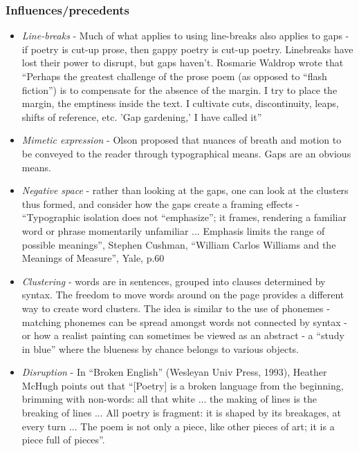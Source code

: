 \documentclass[11pt]{article}
\begin{document}
\subsubsection*{Influences/precedents}
\begin{itemize}
\item \textit{Line-breaks} - Much of what applies to using line-breaks also applies to gaps - if poetry is cut-up prose, then gappy poetry is cut-up poetry.  Linebreaks have lost their power to disrupt, but gaps haven't. Rosmarie Waldrop wrote that ``Perhaps the greatest challenge of the prose poem (as opposed to ``flash fiction'') is to compensate for the absence of the margin. I try to place the margin, the emptiness inside the text. I cultivate cuts, discontinuity, leaps, shifts of reference, etc. 'Gap gardening,' I have called it''

\item \textit{Mimetic expression} -
Olson proposed that nuances of breath and motion to be conveyed to the reader through typographical means. Gaps are an obvious means.

\item \textit{Negative space} - rather than looking at the gaps, one can look at the clusters thus formed, and consider how the gaps create a framing effects -  ``Typographic isolation does not ``emphasize''; it frames, rendering a familiar word or phrase momentarily unfamiliar ... Emphasis limits the range of possible meanings'', Stephen Cushman, ``William Carlos Williams and the Meanings of Measure'', Yale, p.60

\item \textit{Clustering} - words are in sentences, grouped into clauses determined by syntax. The freedom to move words around on the page provides a different way to create word clusters. The idea is similar to the use of phonemes - matching phonemes can be spread amongst words not connected by syntax - or how a realist painting can sometimes be viewed as an abstract - a ``study in blue'' where the blueness by chance belongs to various objects.

\item \textit{Disruption} - 
In ``Broken English'' (Wesleyan Univ Press, 1993), Heather McHugh points out that  ``[Poetry] is a broken language from the beginning, brimming with non-words: all that white ... the making of lines is the breaking of lines ... All poetry is fragment: it is shaped by its breakages, at every turn ... The poem is not only a piece, like other pieces of art; it is a piece full of pieces''.



\end{itemize}
\end{document}
